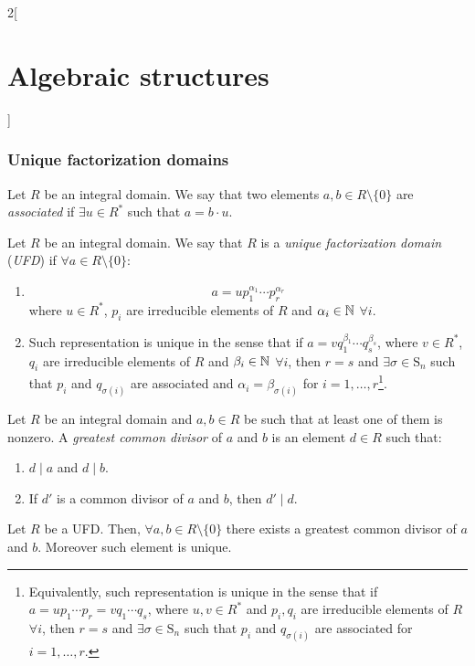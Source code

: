 \documentclass[../../../main_math.tex]{subfiles}
\begin{document}
\begin{multicols}{2}[\section{Algebraic structures}]
  \subsubsection{Unique factorization domains}
  \begin{definition}
    Let $R$ be an integral domain. We say that two elements $a,b\in R\setminus\{0\}$ are \emph{associated} if $\exists u\in R^*$ such that $a=b\cdot u$.
  \end{definition}
  \begin{definition}
    Let $R$ be an integral domain. We say that $R$ is a \emph{unique factorization domain} (\emph{UFD}) if $\forall a\in R\setminus\{0\}$:
    \begin{enumerate}
      \item $$a=up_1^{\alpha_1}\cdots p_r^{\alpha_r}$$ where $u\in R^*$, $p_i$ are irreducible elements of $R$ and $\alpha_i\in\mathbb{N}$ $\forall i$.
      \item Such representation is unique in the sense that if $a=vq_1^{\beta_1}\cdots q_s^{\beta_s}$, where $v\in R^*$, $q_i$ are irreducible elements of $R$ and $\beta_i\in\mathbb{N}$ $\forall i$, then $r=s$ and $\exists\sigma\in \text{S}_n$ such that $p_i$ and $q_{\sigma(i)}$ are associated and $\alpha_i=\beta_{\sigma(i)}$ for $i=1,\ldots,r$\footnote{Equivalently, such representation is unique in the sense that if $a=up_1\cdots p_r=vq_1\cdots q_s$, where $u,v\in R^*$ and $p_i,q_i$ are irreducible elements of $R$ $\forall i$, then $r=s$ and $\exists\sigma\in \text{S}_n$ such that $p_i$ and $q_{\sigma(i)}$ are associated for $i=1,\ldots,r$.}.
    \end{enumerate}
  \end{definition}
  \begin{definition}
    Let $R$ be an integral domain and $a,b\in R$ be such that at least one of them is nonzero. A \emph{greatest common divisor} of $a$ and $b$ is an element $d\in R$ such that:
    \begin{enumerate}
      \item $d\mid a$ and $d\mid b$.
      \item If $d'$ is a common divisor of $a$ and $b$, then $d'\mid d$.
    \end{enumerate}
  \end{definition}
  \begin{proposition}
    Let $R$ be a UFD. Then, $\forall a,b\in R\setminus\{0\}$ there exists a greatest common divisor of $a$ and $b$. Moreover such element is unique.
  \end{proposition}

\end{multicols}
\end{document}
